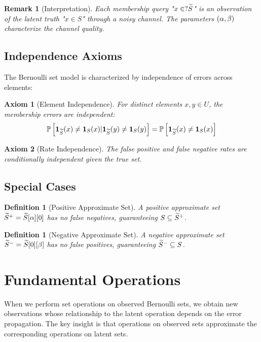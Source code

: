 \documentclass[11pt,final,hidelinks]{article}
\newtheorem{definition}[theorem]{Definition}
\newtheorem{remark}[theorem]{Remark}
\newtheorem{axiom}{Axiom}
\begin{document}
\begin{remark}[Interpretation]
Each membership query "$x \in? \widetilde{S}$" is an observation of the latent truth "$x \in S$" through a noisy channel. The parameters $(\alpha, \beta)$ characterize the channel quality.
\end{remark}

\subsection{Independence Axioms}

The Bernoulli set model is characterized by independence of errors across elements:

\begin{axiom}[Element Independence]
For distinct elements $x, y \in U$, the membership errors are independent:
\begin{equation}
\mathbb{P}\left[\mathbf{1}_{\widetilde{S}}(x) \neq \mathbf{1}_{S}(x) | \mathbf{1}_{\widetilde{S}}(y) \neq \mathbf{1}_{S}(y)\right] = 
\mathbb{P}\left[\mathbf{1}_{\widetilde{S}}(x) \neq \mathbf{1}_{S}(x)\right]
\end{equation}
\end{axiom}

\begin{axiom}[Rate Independence]
The false positive and false negative rates are conditionally independent given the true set.
\end{axiom}

\subsection{Special Cases}

\begin{definition}[Positive Approximate Set]
A positive approximate set $\widetilde{S}^+ = \widetilde{S}[\alpha][0]$ has no false negatives, guaranteeing $S \subseteq \widetilde{S}^+$.
\end{definition}

\begin{definition}[Negative Approximate Set]
A negative approximate set $\widetilde{S}^- = \widetilde{S}[0][\beta]$ has no false positives, guaranteeing $\widetilde{S}^- \subseteq S$.
\end{definition}

\section{Fundamental Operations}

When we perform set operations on observed Bernoulli sets, we obtain new observations whose relationship to the latent operation depends on the error propagation. The key insight is that operations on observed sets approximate the corresponding operations on latent sets.
\end{document}
